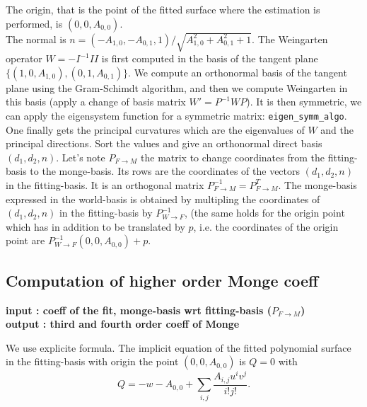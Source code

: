 The origin, that is the point of the fitted surface where the
estimation is performed, is $(0,0,A_{0,0})$. \\ The normal is
$n=(-A_{1,0},-A_{0,1},1)/\sqrt{A_{1,0}^2+A_{0,1}^2+1}$. The Weingarten
operator $W=-I^{-1}II$ is first computed in the basis of the tangent
plane $\{ (1,0,A_{1,0}), (0,1,A_{0,1}) \}$. We compute an orthonormal basis of the
tangent plane using the Gram-Schimdt algorithm, and then we compute
Weingarten in this basis (apply a change of basis matrix
$W'=P^{-1}WP$). It is then symmetric, we can apply the eigensystem
function for a symmetric matrix:
\verb+eigen_symm_algo+.
One finally gets the principal curvatures which are the eigenvalues of
$W$ and the principal directions. Sort the values and give an
orthonormal direct basis $(d_1,d_2,n)$. Let's note $P_{F
\rightarrow M}$ the matrix to change coordinates from the
fitting-basis to the monge-basis. Its rows are the coordinates of the
vectors $(d_1,d_2,n)$ in the fitting-basis. It is an orthogonal matrix
$P_{F \rightarrow M}^{-1}=P_{F \rightarrow M}^T$. The monge-basis
expressed in the world-basis is obtained by multipling the coordinates
of $(d_1,d_2,n)$ in the fitting-basis by $P_{W\rightarrow F}^{-1}$,
(the same holds for the origin point which has in addition to be
translated by $p$, i.e. the coordinates of the origin point are
$P_{W\rightarrow F}^{-1} (0,0,A_{0,0}) +p$.

\subsection{Computation of higher order Monge coeff}

{\bf input : coeff of the fit, monge-basis wrt fitting-basis ($P_{F
\rightarrow M}$)\\ 
output : third and fourth order coeff of Monge}

We use explicite formula. The implicit equation of the fitted
polynomial surface in the fitting-basis with origin the point
$(0,0,A_{0,0})$ is $Q=0$ with
\begin{equation}
Q=-w-A_{0,0}  +\sum_{i,j}\frac{A_{i,j}u^iv^j}{i!j!}.
\end{equation}

